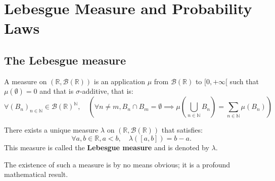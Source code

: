 \chapter{Lebesgue Measure and Probability Laws}%
\sloppy%
\section{The Lebesgue measure}%
\begin{definition}
A measure on $(\mathbb{R}, \mathcal{B}(\mathbb{R}))$ is an application $\mu$ from $\mathcal{B}(\mathbb{R})$ to $[0, +\infty[$ such that $\mu(\emptyset) = 0$ and that is $\sigma$-additive, that is:
\[
\forall (B_n)_{n \in \mathbb{N}} \in \mathcal{B}(\mathbb{R})^{\mathbb{N}}, \quad \left( \forall n \neq m, B_n \cap B_m = \emptyset \implies \mu\left(\bigcup_{n \in \mathbb{N}} B_n\right) = \sum_{n \in \mathbb{N}} \mu(B_n) \right)
\]
\end{definition}%
\begin{theorem}
There exists a unique measure $\lambda$ on $(\mathbb{R}, \mathcal{B}(\mathbb{R}))$ that satisfies:
\[
\forall a, b \in \mathbb{R}, a < b, \quad \lambda([a,b]) = b-a.
\]
This measure is called the \textbf{Lebesgue measure} and is denoted by $\lambda$.
\end{theorem}%
\begin{remark}
The existence of such a measure is by no means obvious; it is a profound mathematical result.
\end{remark}%

